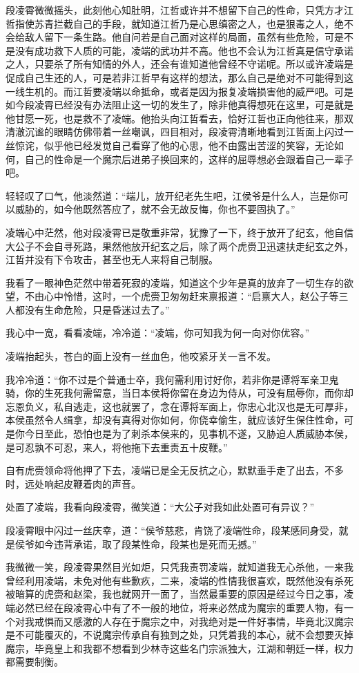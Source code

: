 段凌霄微微摇头，此刻他心知肚明，江哲或许并不想留下自己的性命，只凭方才江哲指使苏青拦截自己的手段，就知道江哲乃是心思缜密之人，也是狠毒之人，绝不会给敌人留下一条生路。他自问若是自己面对这样的局面，虽然有些危险，可是不是没有成功救下人质的可能，凌端的武功并不高。他也不会认为江哲真是信守承诺之人，只要杀了所有知情的外人，还会有谁知道他曾经不守诺呢。所以或许凌端是促成自己生还的人，可是若非江哲早有这样的想法，那么自己是绝对不可能得到这一线生机的。而江哲要凌端以命抵命，或者是因为报复凌端损害他的威严吧。可是如今段凌霄已经没有办法阻止这一切的发生了，除非他真得想死在这里，可是就是他甘愿一死，也是救不了凌端。他抬头向江哲看去，恰好江哲也正向他往来，那双清澈沉谧的眼睛仿佛带着一丝嘲讽，四目相对，段凌霄清晰地看到江哲面上闪过一丝惊诧，似乎他已经发觉自己看穿了他的心思，他不由露出苦涩的笑容，无论如何，自己的性命是一个魔宗后进弟子换回来的，这样的屈辱想必会跟着自己一辈子吧。

轻轻叹了口气，他淡然道：“端儿，放开纪老先生吧，江侯爷是什么人，岂是你可以威胁的，如今他既然答应了，就不会无故反悔，你也不要固执了。”

凌端心中茫然，他对段凌霄已是敬重非常，犹豫了一下，终于放开了纪玄，他自信大公子不会自寻死路，果然他放开纪玄之后，除了两个虎赍卫迅速扶走纪玄之外，江哲并没有下令攻击，甚至也无人来将自己制服。

我看了一眼神色茫然中带着死寂的凌端，知道这个少年是真的放弃了一切生存的欲望，不由心中怜惜，这时，一个虎赍卫匆匆赶来禀报道：“启禀大人，赵公子等三人都没有生命危险，只是昏迷过去了。”

我心中一宽，看看凌端，冷冷道：“凌端，你可知我为何一向对你优容。”

凌端抬起头，苍白的面上没有一丝血色，他咬紧牙关一言不发。

我冷冷道：“你不过是个普通士卒，我何需利用讨好你，若非你是谭将军亲卫鬼骑，你的生死我何需留意，当日本侯将你留在身边为侍从，可没有屈辱你，而你却忘恩负义，私自逃走，这也就罢了，念在谭将军面上，你忠心北汉也是无可厚非，本侯虽然令人缉拿，却没有真得对你如何，你侥幸偷生，就应该好生保住性命，可是你今日至此，恐怕也是为了刺杀本侯来的，见事机不遂，又胁迫人质威胁本侯，是可忍孰不可忍，来人，将他拖下去重责五十皮鞭。”

自有虎赍领命将他押了下去，凌端已是全无反抗之心，默默垂手走了出去，不多时，远处响起皮鞭着肉的声音。

处置了凌端，我看向段凌霄，微笑道：“大公子对我如此处置可有异议？”

段凌霄眼中闪过一丝庆幸，道：“侯爷慈悲，肯饶了凌端性命，段某感同身受，就是侯爷如今违背承诺，取了段某性命，段某也是死而无撼。”

我微微一笑，段凌霄果然目光如炬，只凭我责罚凌端，就知道我无心杀他，一来我曾经利用凌端，未免对他有些歉疚，二来，凌端的性情我很喜欢，既然他没有杀死被暗算的虎赍和赵梁，我也就网开一面了，当然最重要的原因是经过今日之事，凌端必然已经在段凌霄心中有了不一般的地位，将来必然成为魔宗的重要人物，有一个对我戒惧而又感激的人存在于魔宗之中，对我绝对是一件好事情，毕竟北汉魔宗是不可能覆灭的，不说魔宗传承自有独到之处，只凭着我的本心，就不会想要灭掉魔宗，毕竟皇上和我都不想看到少林寺这些名门宗派独大，江湖和朝廷一样，权力都需要制衡。


